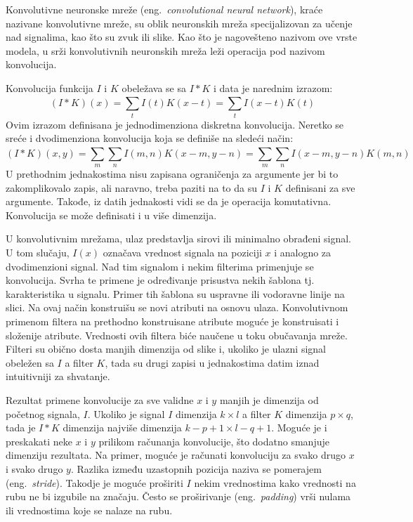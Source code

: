 Konvolutivne neuronske mreže (eng.~{\em convolutional neural network}), kraće nazivane konvolutivne mreže, su oblik neuronskih mreža specijalizovan za učenje nad signalima, kao što su zvuk ili slike. Kao što je nagovešteno nazivom ove vrste modela, u srži konvolutivnih neuronskih mreža leži operacija pod nazivom konvolucija.
\par 
Konvolucija funkcija $I$ i $K$ obeležava se sa $I \ast K$ i data je narednim izrazom:
\begin{equation}
	(I \ast K)(x) = \sum_{t}^{} I(t)K(x-t) = \sum_{t}^{} I(x-t)K(t)
\end{equation}
Ovim izrazom definisana je jednodimenziona diskretna konvolucija. Neretko se sreće i dvodimenziona konvolucija koja se definiše na sledeći način:
\begin{equation}
	(I \ast K)(x, y) = \sum_{m}^{}\sum_{n}^{} I(m, n)K(x-m, y-n) = \sum_{m}^{}\sum_{n}^{} I(x-m, y-n)K(m, n)
\end{equation}
U prethodnim jednakostima nisu zapisana ograničenja za argumente jer bi to zakomplikovalo zapis, ali naravno, treba paziti na to da su $I$ i $K$ definisani za sve argumente. Takođe, iz datih jednakosti vidi se da je operacija komutativna. Konvolucija se može definisati i u više dimenzija.
\par 
U konvolutivnim mrežama, ulaz predstavlja sirovi ili minimalno obrađeni signal. U tom slučaju, $I(x)$ označava vrednost signala na poziciji $x$ i analogno za dvodimenzioni signal. Nad tim signalom i nekim filterima primenjuje se konvolucija. Svrha te primene je određivanje prisustva nekih šablona tj. karakteristika u signalu. Primer tih šablona su uspravne ili vodoravne linije na slici. Na ovaj način konstruišu se novi atributi na osnovu ulaza. Konvolutivnom primenom filtera na prethodno konstruisane atribute moguće je konstruisati i složenije atribute. Vrednosti ovih filtera biće naučene u toku obučavanja mreže. Filteri su obično dosta manjih dimenzija od slike i, ukoliko je ulazni signal obeležen sa $I$ a filter $K$, tada su drugi zapisi u jednakostima datim iznad intuitivniji za shvatanje.
\par 
Rezultat primene konvolucije za sve validne $x$ i $y$ manjih je dimenzija od početnog signala, $I$. Ukoliko je signal $I$ dimenzija $k \times l$ a filter $K$ dimenzija $p \times q$, tada je $I \ast K$ dimenzija najviše dimenzija $k-p+1 \times l-q+1$. Moguće je i preskakati neke $x$ i $y$ prilikom računanja konvolucije, što dodatno smanjuje dimenziju rezultata. Na primer, moguće je računati konvoluciju za svako drugo $x$ i svako drugo $y$. Razlika između uzastopnih pozicija naziva se pomerajem (eng.~{\em stride}). Takodje je moguće proširiti $I$ nekim vrednostima kako vrednosti na rubu ne bi izgubile na značaju. Često se proširivanje (eng.~{\em padding}) vrši nulama ili vrednostima koje se nalaze na rubu.
